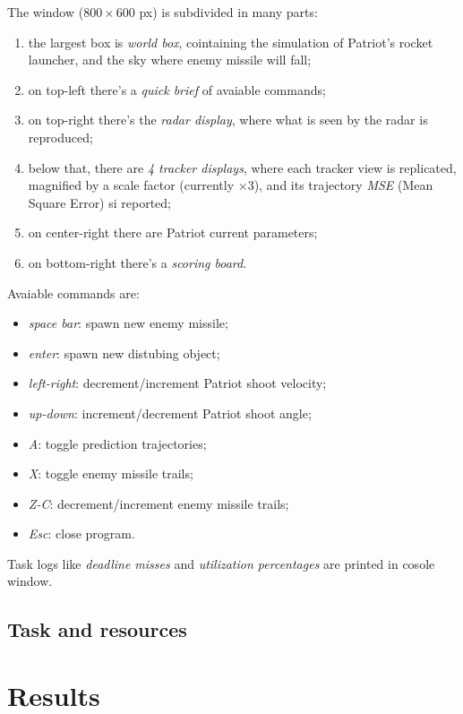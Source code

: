 \documentclass[notitlepage,a4paper,11pt]{article} %
\begin{document}
		The window ($800\times600$ px) is subdivided in many parts:
		\begin{enumerate}
			\item the largest box is \emph{world box}, cointaining the simulation of Patriot's rocket launcher, and the sky where enemy missile will fall;
			\item on top-left there's a \emph{quick brief} of avaiable commands;
			\item on top-right there's the \emph{radar display}, where what is seen by the radar is reproduced;
			\item below that, there are \emph{4 tracker displays}, where each tracker view is replicated, magnified by a scale factor (currently $\times3$), and its trajectory \emph{MSE} (Mean Square Error) si reported;
			\item on center-right there are Patriot current parameters;
			\item on bottom-right there's a \emph{scoring board}.
		\end{enumerate}
		Avaiable commands are:
		\begin{itemize}
			\item \emph{space bar}: spawn new enemy missile;
			\item \emph{enter}: spawn new distubing object;
			\item \emph{left-right}: decrement/increment Patriot shoot velocity;
			\item \emph{up-down}: increment/decrement Patriot shoot angle;
			\item \emph{A}: toggle prediction trajectories;
			\item \emph{X}: toggle enemy missile trails;
			\item \emph{Z-C}: decrement/increment enemy missile trails;
			\item \emph{Esc}: close program.
		\end{itemize}
		Task logs like \emph{deadline misses} and \emph{utilization percentages} are printed in cosole window.

	\subsection{Task and resources}
\section{Results}

\newpage
\hypersetup{linkcolor=black}
\listoffigures
\hypersetup{linkcolor=blue}
\end{document}
